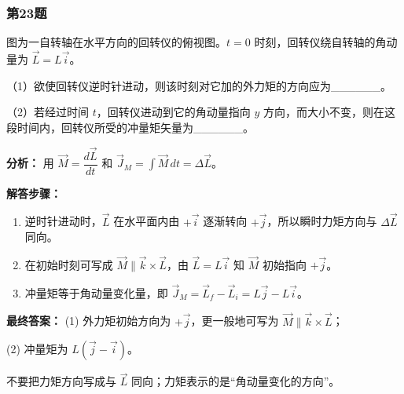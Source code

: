 \documentclass[12pt,a4paper]{ctexart}
\begin{document}
\subsubsection*{第23题}
\begin{tcolorbox}[colback=gray!2!white,colframe=black!60,title={题目}]
图为一自转轴在水平方向的回转仪的俯视图。\(t=0\) 时刻，回转仪绕自转轴的角动量为 \(\vec L=L\vec i\)。\par
（1）欲使回转仪逆时针进动，则该时刻对它加的外力矩的方向应为\_\_\_\_\_\_。\par
（2）若经过时间 \(t\)，回转仪进动到它的角动量指向 \(y\) 方向，而大小不变，则在这段时间内，回转仪所受的冲量矩矢量为\_\_\_\_\_\_。\par
\end{tcolorbox}
\begin{tcolorbox}[colback=blue!2!white,colframe=blue!55!black,title={完整答案}]
\textbf{分析：}
用 \(\vec M=\dfrac{d\vec L}{dt}\) 和 \(\vec J_M=\int \vec M\,dt=\Delta \vec L\)。\par
\textbf{解答步骤：}
\begin{enumerate}
\item 逆时针进动时，\(\vec L\) 在水平面内由 \(+\vec i\) 逐渐转向 \(+\vec j\)，所以瞬时力矩方向与 \(\Delta \vec L\) 同向。
\item 在初始时刻可写成 \(\vec M\parallel \vec k\times \vec L\)，由 \(\vec L=L\vec i\) 知 \(\vec M\) 初始指向 \(+\vec j\)。
\item 冲量矩等于角动量变化量，即 \(\vec J_M=\vec L_f-\vec L_i=L\vec j-L\vec i\)。
\end{enumerate}
\textbf{最终答案：}
(1) 外力矩初始方向为 \(+\vec j\)，更一般地可写为 \(\vec M\parallel \vec k\times \vec L\)；\par
(2) 冲量矩为 \(L(\vec j-\vec i)\)。\par
\end{tcolorbox}
\begin{tcolorbox}[colback=red!2!white,colframe=red!55!black,title={易错点}]
不要把力矩方向写成与 \(\vec L\) 同向；力矩表示的是“角动量变化的方向”。\par
\end{tcolorbox}
\end{document}

